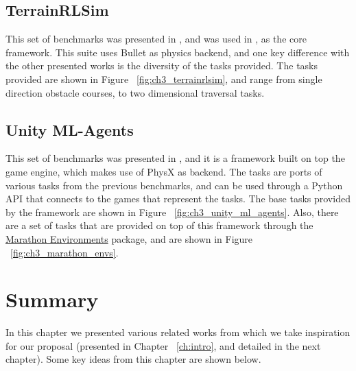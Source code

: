 \figBenchmarksGpuSim

\subsection{TerrainRLSim}

This set of benchmarks was presented in \cite{TerrainRLSim}, and was used in \cite{DeepTerrainRL}, 
\cite{ActuationChoice} as the core framework. This suite uses Bullet as physics backend,
and one key difference with the other presented works is the diversity of the tasks provided.
The tasks provided are shown in Figure ~\ref{fig:ch3_terrainrlsim}, and range from 
single direction obstacle courses, to two dimensional traversal tasks.

\figBenchmarksTerrainRLSim

\subsection{Unity ML-Agents}

This set of benchmarks was presented in \cite{UnityMLAgents}, and it is a framework 
built on top the \citeauthor{Unity} game engine, which makes use of PhysX as backend. 
The tasks are ports of various tasks from the previous benchmarks, and can be used
through a Python API that connects to the games that represent the tasks. The base tasks
provided by the framework are shown in Figure ~\ref{fig:ch3_unity_ml_agents}. Also, 
there are a set of tasks that are provided on top of this framework through the 
\href{https://github.com/Unity-Technologies/marathon-envs}{Marathon Environments} 
package, and are shown in Figure ~\ref{fig:ch3_marathon_envs}.

\figBenchmarksUnityMLAgents

\figBenchmarksMarathonEnvs

\section{Summary}

In this chapter we presented various related works from which we take inspiration
for our proposal (presented in Chapter ~\ref{ch:intro}, and detailed in the next
chapter). Some key ideas from this chapter are shown below.

